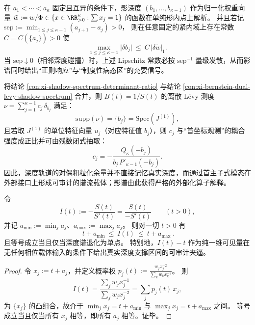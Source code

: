 \begin{proposition}\label{con:xi-shadow-spectrum-stability}
在 \(a_1<\cdots<a_\kappa\) 固定且互异的条件下，影深度 \((b_1,\dots,b_{\kappa-1})\) 作为归一化权重向量
\(
\tilde w:=w/\Phi\in\{x\in\RR_{>0}^\kappa:\sum x_j=1\}
\)
的函数在单纯形内点上解析。
并且若记
\(
\mathrm{sep}:=\min_{1\le j\le \kappa-1}(a_{j+1}-a_j)>0
\)，
则在任意固定的紧内域上存在常数 \(C=C(\{a_j\})>0\) 使
\[
\max_{1\le j\le \kappa-1}\bigl|\delta b_j\bigr|
\ \le\ C\,\bigl|\delta \tilde w\bigr|_1.
\]
当 \(\mathrm{sep}\downarrow 0\)（相邻深度碰撞）时，上述 Lipschitz 常数必按 \(\mathrm{sep}^{-1}\) 量级发散，从而影谱同时给出“正则响应”与“制度性病态区”的充要信号。
\end{proposition}

\begin{proposition}\label{con:xi-shadow-spectrum-operator-meaning}
将结论 \ref{con:xi-shadow-spectrum-determinant-ratio} 与结论 \ref{con:xi-bernstein-dual-levy-shadow-spectrum} 合并，则 \(B(t)=1/S(t)\) 的离散 Lévy 测度
\(
\nu=\sum_{j=1}^{\kappa-1}c_j\,\delta_{b_j}
\)
满足：
\[
\mathrm{supp}(\nu)=\{b_j\}=\mathrm{Spec}(J^{(1)}),
\]
且若取 \(J^{(1)}\) 的单位特征向量 \(u_j\)（对应特征值 \(b_j\)），则 \(c_j\) 与“首坐标观测”的耦合强度成正比并可由残数闭式抽取：
\[
c_j=-\frac{Q_{\kappa}(-b_j)}{b_j\,P'_{\kappa-1}(-b_j)}.
\]
因此，深度轨道的对偶粗粒化余量并不直接记忆真实深度，而通过首主子式模态在外部接口上形成可审计的谱流载体；影谱由此获得严格的外部化算子解释。
\end{proposition}

\begin{proposition}[支持集夹逼：\texorpdfstring{$I(t)=-S(t)/S'(t)$}{I(t)} 在每个尺度上夹逼深度区间]\label{con:xi-support-squeeze-I}
令
\[
I(t):=-\frac{S(t)}{S'(t)}=\frac{S(t)}{-S'(t)}\qquad (t>0),
\]
并记 \(a_{\min}:=\min_j a_j\)、\(a_{\max}:=\max_j a_j\)。
则对一切 \(t>0\) 有
\[
\boxed{\;
t+a_{\min}\ \le\ I(t)\ \le\ t+a_{\max}\; }.
\]
且等号成立当且仅当深度谱退化为单点。
特别地，\(I(t)-t\) 作为纯一维可见量在无任何相位载体输入的条件下给出真实深度支撑区间的可审计夹逼。
\end{proposition}
\begin{proof}
令 \(x_j:=t+a_j\)，并定义概率权
\(
p_j(t):=\frac{w_j x_j^{-2}}{\sum_{k}w_k x_k^{-2}}
\)。
则
\[
I(t)=\frac{\sum_j w_j x_j^{-1}}{\sum_j w_j x_j^{-2}}
=\sum_{j}p_j(t)\,x_j,
\]
为 \(\{x_j\}\) 的凸组合，故介于 \(\min_j x_j=t+a_{\min}\) 与 \(\max_j x_j=t+a_{\max}\) 之间。
等号成立当且仅当所有 \(x_j\) 相等，即所有 \(a_j\) 相等。证毕。
\end{proof}

\endinput

